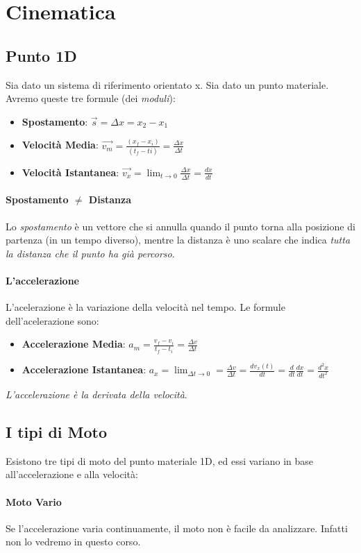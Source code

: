 \documentclass[12pt, a4paper, openany]{book}
\begin{document}
\section{Cinematica}
\subsection{Punto 1D}
Sia dato un sistema di riferimento orientato x.
Sia dato un punto materiale.
Avremo queste tre formule (dei \emph{moduli}):
\begin{itemize}
    \item \textbf{Spostamento}: $\overrightarrow{s}=\Delta x = x_2-x_1$
    \item \textbf{Velocità Media}: $\overrightarrow{v_m} = \frac{(x_f-x_i)}{(t_f-ti)} = \frac{\Delta x}{\Delta t}$
    \item \textbf{Velocità Istantanea}: $\overrightarrow{v_x} = \lim_{t\to 0} \frac{\Delta x}{\Delta t} = \frac{dx}{dt}$
\end{itemize}
\paragraph{Spostamento $\neq$ Distanza}
Lo \emph{spostamento} è un vettore che si annulla quando il punto torna alla posizione di partenza (in un tempo diverso),
mentre la distanza è uno scalare che indica \emph{tutta la distanza che il punto ha già percorso}.
\paragraph{L'accelerazione} L'acelerazione è la variazione della velocità nel tempo.
Le formule dell'acelerazione sono:
\begin{itemize}
    \item \textbf{Accelerazione Media}: $a_m = \frac{v_f-v_i}{t_f-t_i} = \frac{\Delta v}{\Delta t}$
    \item \textbf{Accelerazione Istantanea}: $a_x = \lim_{\Delta t \to 0} = \frac{\Delta v}{\Delta t} = \frac{dv_x(t)}{dt}= \frac{d}{dt}\frac{dx}{dt} = \frac{d^2x}{dt^2}$
\end{itemize}
\emph{L'accelerazione è la derivata della velocità}.
\subsection{I tipi di Moto}
Esistono tre tipi di moto del punto materiale 1D, ed essi variano in base all'accelerazione e alla velocità:
\paragraph*{Moto Vario} Se l'accelerazione varia continuamente, il moto non è facile da analizzare. Infatti non lo vedremo in questo corso.
\end{document}
